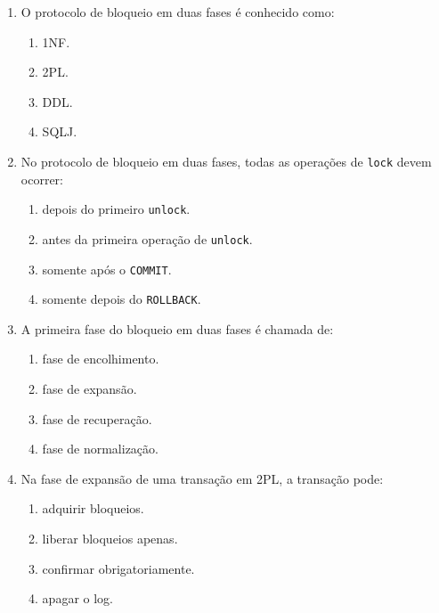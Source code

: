\documentclass[12pt,a4paper]{article}
\begin{document}
\begin{enumerate}[label=\textbf{Q\arabic*.}]
\begin{enumerate}[label=\alph*)]
    \item o posicionamento das operações de bloqueio e desbloqueio.
    \item apenas o nome das tabelas.
    \item apenas o número de atributos.
    \item apenas o tipo de dado das colunas.
\end{enumerate}

\item O protocolo de bloqueio em duas fases é conhecido como:

\begin{enumerate}[label=\alph*)]
    \item 1NF.
    \item 2PL.
    \item DDL.
    \item SQLJ.
\end{enumerate}

\item No protocolo de bloqueio em duas fases, todas as operações de \texttt{lock} devem ocorrer:

\begin{enumerate}[label=\alph*)]
    \item depois do primeiro \texttt{unlock}.
    \item antes da primeira operação de \texttt{unlock}.
    \item somente após o \texttt{COMMIT}.
    \item somente depois do \texttt{ROLLBACK}.
\end{enumerate}

\item A primeira fase do bloqueio em duas fases é chamada de:

\begin{enumerate}[label=\alph*)]
    \item fase de encolhimento.
    \item fase de expansão.
    \item fase de recuperação.
    \item fase de normalização.
\end{enumerate}

\item Na fase de expansão de uma transação em 2PL, a transação pode:

\begin{enumerate}[label=\alph*)]
    \item adquirir bloqueios.
    \item liberar bloqueios apenas.
    \item confirmar obrigatoriamente.
    \item apagar o log.
\end{enumerate}


\end{enumerate}
\end{document}
